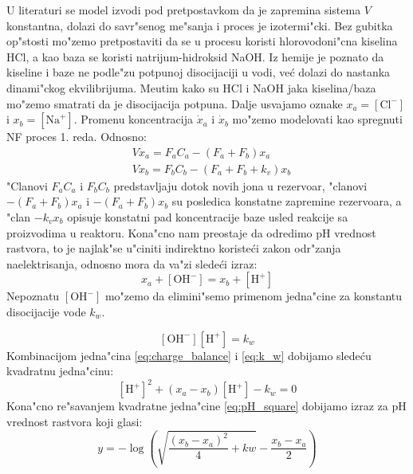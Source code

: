 \documentclass[a4paper,11pt]{article}
\theoremstyle{definition} \newtheorem{deff}{Definicija}[section]
\theoremstyle{definition} \newtheorem{prim}[deff]{Primer}
\theoremstyle{plain} \newtheorem{teor}[deff]{Teorema}
\begin{document}
	U literaturi se model izvodi pod pretpostavkom da je zapremina sistema $V$ konstantna, dolazi do savr"senog me"sanja i proces je izotermi"cki. Bez gubitka op"stosti mo"zemo pretpostaviti da se u procesu koristi hlorovodoni"cna kiselina HCl, a kao baza se koristi natrijum-hidroksid NaOH. Iz hemije je poznato da kiseline i baze ne podle"zu potpunoj disocijaciji u vodi, ve\'c dolazi do nastanka dinami"ckog ekvilibrijuma.
	Me\dj{}utim kako su HCl i NaOH jaka kiselina/baza mo"zemo smatrati da je disocijacija potpuna. Dalje usvajamo oznake $x_a = [\text{Cl}^-]$ i $x_b = [\text{Na}^+]$. Promenu koncentracija $\dot{x}_a$ i $\dot{x}_b$ mo"zemo modelovati kao spregnuti NF proces 1. reda. Odnosno: 
	\begin{align}\label{eq:ion_balance}
		&V\dot{x}_a = F_aC_a - (F_a + F_b)x_a \\
		&V\dot{x}_b = F_bC_b - (F_a + F_b + k_v)x_b 
	\end{align}
	"Clanovi $F_aC_a$ i $F_bC_b$ predstavljaju dotok novih jona u rezervoar, "clanovi $-(F_a + F_b)x_a$ i $-(F_a + F_b)x_b$ su posledica konstatne zapremine rezervoara, a "clan $-k_vx_b$ opisuje konstatni pad koncentracije baze usled reakcije sa proizvodima u reaktoru. Kona"cno nam preostaje da odredimo pH vrednost rastvora, to je najlak"se u"ciniti indirektno koriste\'ci zakon odr"zanja naelektrisanja, odnosno mora da va"zi slede\'ci izraz: 
	\begin{equation}\label{eq:charge_balance}
		x_a + [\text{OH}^-] = x_b + [\text{H}^+]
	\end{equation}
	Nepoznatu $[\text{OH}^-]$ mo"zemo da elimini"semo primenom jedna"cine za konstantu disocijacije vode $k_w$.
	
	\begin{equation}\label{eq:k_w}
		[\text{OH}^-][\text{H}^+] = k_w
	\end{equation}
	Kombinacijom jedna"cina \eqref{eq:charge_balance} i \eqref{eq:k_w} dobijamo slede\'cu kvadratnu jedna"cinu:
	\begin{equation}\label{eq:pH_square}
		[\text{H}^+]^2 + (x_a - x_b)[\text{H}^+] - k_w = 0
	\end{equation} 
	Kona"cno re"savanjem kvadratne jedna"cine \eqref{eq:pH_square} dobijamo izraz za pH vrednost rastvora koji glasi: 
	\begin{equation}\label{eq:pH}
		y = -\log\left(\sqrt{\frac{(x_b - x_a)^2}{4} + kw} - \frac{x_b - x_a}{2}\right)
	\end{equation}
	
	\clearpage
	
\end{document}
